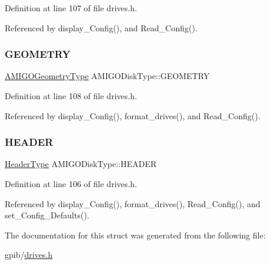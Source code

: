 Definition at line 107 of file drives.\+h.



Referenced by display\+\_\+\+Config(), and Read\+\_\+\+Config().

\mbox{\label{structAMIGODiskType_ade07402a60cc0e5824ca61f6a4ea88d9}} 
\subsubsection{\texorpdfstring{G\+E\+O\+M\+E\+T\+RY}{GEOMETRY}}
{\footnotesize\ttfamily \hyperlink{structAMIGOGeometryType}{A\+M\+I\+G\+O\+Geometry\+Type} A\+M\+I\+G\+O\+Disk\+Type\+::\+G\+E\+O\+M\+E\+T\+RY}



Definition at line 108 of file drives.\+h.



Referenced by display\+\_\+\+Config(), format\+\_\+drives(), and Read\+\_\+\+Config().

\mbox{\label{structAMIGODiskType_a9814efe6f564b104fc7e0100231908a8}} 
\subsubsection{\texorpdfstring{H\+E\+A\+D\+ER}{HEADER}}
{\footnotesize\ttfamily \hyperlink{structHeaderType}{Header\+Type} A\+M\+I\+G\+O\+Disk\+Type\+::\+H\+E\+A\+D\+ER}



Definition at line 106 of file drives.\+h.



Referenced by display\+\_\+\+Config(), format\+\_\+drives(), Read\+\_\+\+Config(), and set\+\_\+\+Config\+\_\+\+Defaults().



The documentation for this struct was generated from the following file\+:\begin{DoxyCompactItemize}
\item 
gpib/\hyperlink{drives_8h}{drives.\+h}\end{DoxyCompactItemize}
